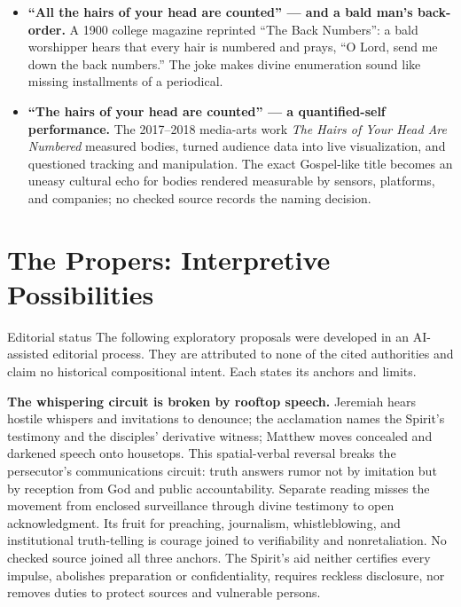 \begin{deepstudy}
{\begin{itemize}
\item \textbf{“All the hairs of your head are counted” --- and a bald man's back-order.\enspace{}} A 1900 college magazine reprinted “The Back Numbers”: a bald worshipper hears that every hair is numbered and prays, “O Lord, send me down the back numbers.” The joke makes divine enumeration sound like missing installments of a periodical.

\item \textbf{“The hairs of your head are counted” --- a quantified-self performance.\enspace{}} The 2017--2018 media-arts work \emph{The Hairs of Your Head Are Numbered} measured bodies, turned audience data into live visualization, and questioned tracking and manipulation. The exact Gospel-like title becomes an uneasy cultural echo for bodies rendered measurable by sensors, platforms, and companies; no checked source records the naming decision.
\end{itemize}
}

\section*{The Propers: Interpretive Possibilities}

\begin{studybox}{Editorial status}
The following exploratory proposals were developed in an AI-assisted editorial process. They are attributed to none of the cited authorities and claim no historical compositional intent. Each states its anchors and limits.
\end{studybox}

\noindent\textbf{The whispering circuit is broken by rooftop speech.\enspace{}}
Jeremiah hears hostile whispers and invitations to denounce; the acclamation names the Spirit's testimony and the disciples' derivative witness; Matthew moves concealed and darkened speech onto housetops. This spatial-verbal reversal breaks the persecutor's communications circuit: truth answers rumor not by imitation but by reception from God and public accountability. Separate reading misses the movement from enclosed surveillance through divine testimony to open acknowledgment. Its fruit for preaching, journalism, whistleblowing, and institutional truth-telling is courage joined to verifiability and nonretaliation. No checked source joined all three anchors. The Spirit's aid neither certifies every impulse, abolishes preparation or confidentiality, requires reckless disclosure, nor removes duties to protect sources and vulnerable persons.


\end{deepstudy}
